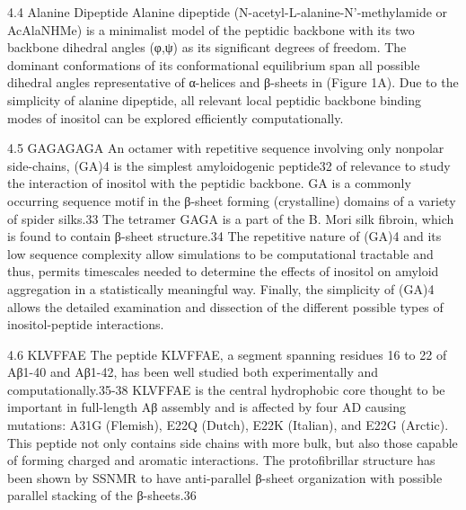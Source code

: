 4.4	Alanine Dipeptide
	Alanine dipeptide (N-acetyl-L-alanine-N'-methylamide or AcAlaNHMe) is a minimalist model of the peptidic backbone with its two backbone dihedral angles (φ,ψ) as its significant degrees of freedom.  The dominant conformations of its conformational equilibrium span all possible dihedral angles representative of α-helices and β-sheets in (Figure 1A).  Due to the simplicity of alanine dipeptide, all relevant local peptidic backbone binding modes of inositol can be explored efficiently computationally.

4.5	GAGAGAGA
	An octamer with repetitive sequence involving only nonpolar side-chains, (GA)4 is the simplest amyloidogenic peptide32 of relevance to study the interaction of inositol with the peptidic backbone. GA is a commonly occurring sequence motif in the β-sheet forming (crystalline) domains of a variety of spider silks.33 The tetramer GAGA is a part of the B. Mori silk fibroin, which is found to contain β-sheet structure.34 The repetitive nature of (GA)4 and its low sequence complexity allow simulations to be computational tractable and thus, permits timescales needed to determine the effects of inositol on amyloid aggregation in a statistically meaningful way.  Finally, the simplicity of (GA)4 allows the detailed examination and dissection of the different possible types of inositol-peptide interactions.  

4.6	KLVFFAE
	The peptide KLVFFAE, a segment spanning residues 16 to 22 of Aβ1-40 and Aβ1-42, has been well studied both experimentally and computationally.35-38 KLVFFAE is the central hydrophobic core thought to be important in full-length Aβ assembly and is affected by four AD causing mutations: A31G (Flemish), E22Q (Dutch), E22K (Italian), and E22G (Arctic).  This peptide not only contains side chains with more bulk, but also those capable of forming charged and aromatic interactions. The protofibrillar structure has been shown by SSNMR to have anti-parallel β-sheet organization with possible parallel stacking of the β-sheets.36  



